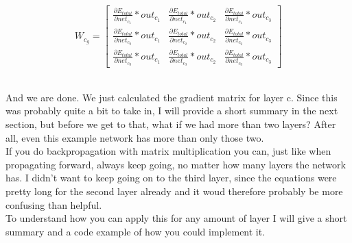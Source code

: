 \documentclass[11pt, halfparskip]{article}
\begin{document}
    \[
    	W_{c_g} = 
    	\begin{bmatrix}
    		\frac{\partial E_{total}}{\partial net_{c_1}} * out_{c_1} & \frac{\partial E_{total}}{\partial net_{c_1}} * out_{c_2}
    		& \frac{\partial E_{total}}{\partial net_{c_1}} * out_{c_3}\\
    		\frac{\partial E_{total}}{\partial net_{c_2}} * out_{c_1} & \frac{\partial E_{total}}{\partial net_{c_2}} * out_{c_2}
    		& \frac{\partial E_{total}}{\partial net_{c_2}} * out_{c_3}\\
    		\frac{\partial E_{total}}{\partial net_{c_3}} * out_{c_1} & \frac{\partial E_{total}}{\partial net_{c_3}} * out_{c_2}
    		& \frac{\partial E_{total}}{\partial net_{c_3}} * out_{c_3}
    	\end{bmatrix}
    \]
    
    \noindent \\
    And we are done. We just calculated the gradient matrix for layer c. Since this was probably quite a bit to take in, I will provide a short summary in the next section, but before we
    get to that, what if we had more than two layers? After all, even this example network has more than only those two.\\
    If you do backpropagation with matrix multiplication you can, just like when propagating forward, always keep going, no matter how many layers the network has. I didn't want to
    keep going on to the third layer, since the equations were pretty long for the second layer already and it woud therefore probably be more confusing than helpful.\\
    To understand how you can apply this for any amount of layer I will give a short summary and a code example of how you could implement it.
    
    \newpage
\end{document}

